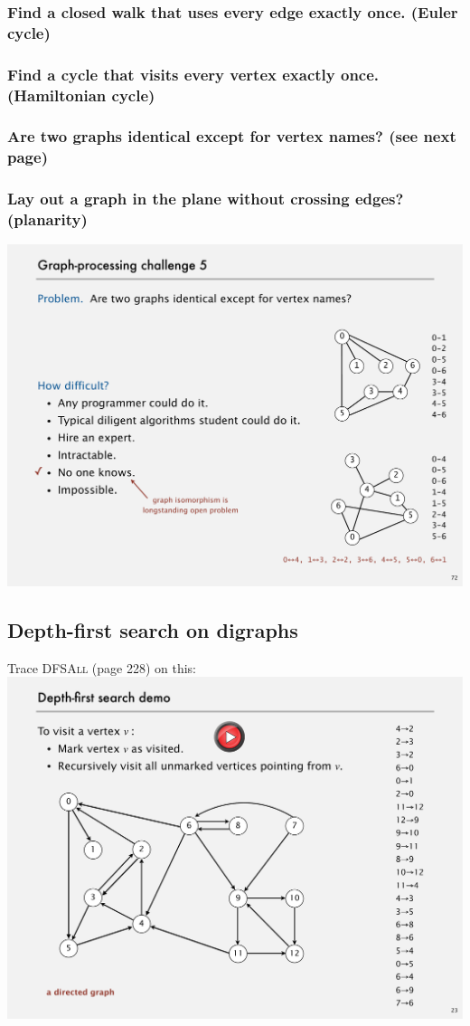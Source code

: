 \documentclass[12pt]{article}
\begin{document}
\subsubsection{Find a closed walk that uses every edge exactly once. (Euler cycle)}
\subsubsection{Find a cycle that visits every vertex exactly once. (Hamiltonian cycle)}
\subsubsection{Are two graphs identical except for vertex names? (see next page)}
\subsubsection{Lay out a graph in the plane without crossing edges? (planarity)}

\clearpage
\includegraphics{w07-graph3.pdf}


\clearpage
\subsection{Depth-first search on digraphs}

Trace \textsc{DFSAll} (page 228) on this:
\includegraphics[scale=.5]{w07-graph4.pdf}
\end{document}

